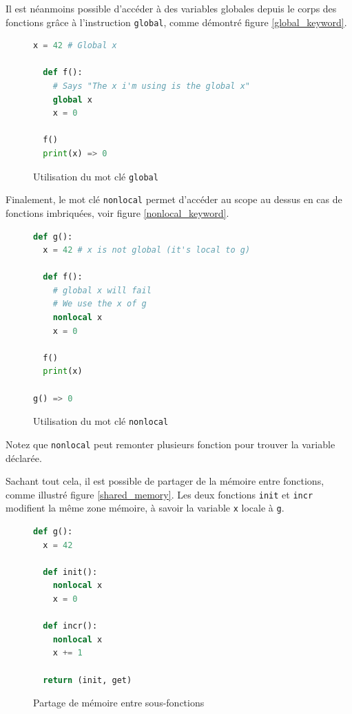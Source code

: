 \documentclass[a4paper, french, 11pt]{article}
\theoremstyle{break}
\begin{document}
Il est néanmoins possible d'accéder à des variables globales depuis le corps des fonctions grâce à l'instruction \texttt{global}, comme démontré figure \vref{global_keyword}.

\begin{figure}[h]
  \centering
  \begin{minipage}{0.7\linewidth}
\begin{lstlisting}[style=myStyle, language=python]
  x = 42 # Global x

  def f():
    # Says "The x i'm using is the global x"
    global x
    x = 0

  f()
  print(x) => 0
\end{lstlisting}
  \end{minipage}
  \caption{\label{global_keyword}Utilisation du mot clé \texttt{global}}
\end{figure}

Finalement, le mot clé \texttt{nonlocal} permet d'accéder au scope \og au dessus\fg{} en cas de fonctions imbriquées, voir figure \vref{nonlocal_keyword}.

\begin{figure}[h]
  \centering
  \begin{minipage}{0.7\linewidth}
\begin{lstlisting}[style=myStyle, language=python, morekeywords={nonlocal}]
def g():
  x = 42 # x is not global (it's local to g)

  def f():
    # global x will fail
    # We use the x of g
    nonlocal x
    x = 0

  f()
  print(x)

g() => 0
\end{lstlisting}
  \end{minipage}
  \caption{\label{nonlocal_keyword}Utilisation du mot clé \texttt{nonlocal}}
\end{figure}

Notez que \texttt{nonlocal} peut remonter plusieurs fonction pour trouver la variable déclarée.

Sachant tout cela, il est possible de partager de la mémoire entre fonctions, comme illustré figure \vref{shared_memory}.
Les deux fonctions \texttt{init} et \texttt{incr} modifient la même zone mémoire, à savoir la variable \texttt{x} locale à \texttt{g}.
\begin{figure}[ht!]
  \centering
  \begin{minipage}{0.7\linewidth}
\begin{lstlisting}[style=myStyle, language=python, morekeywords={nonlocal}]
def g():
  x = 42

  def init():
    nonlocal x
    x = 0

  def incr():
    nonlocal x
    x += 1

  return (init, get)
\end{lstlisting}
  \end{minipage}
  \caption{\label{shared_memory}Partage de mémoire entre sous-fonctions}
\end{figure}
\end{document}
